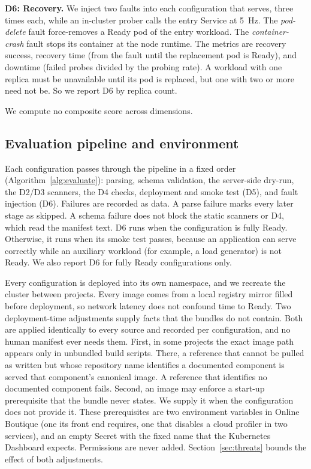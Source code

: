 \textbf{D6: Recovery.} We inject two faults into each configuration that serves, three times each, while an in-cluster prober calls the entry Service at 5~Hz. The \emph{pod-delete} fault force-removes a Ready pod of the entry workload. The \emph{container-crash} fault stops its container at the node runtime. The metrics are recovery success, recovery time (from the fault until the replacement pod is Ready), and downtime (failed probes divided by the probing rate). A workload with one replica must be unavailable until its pod is replaced, but one with two or more need not be. So we report D6 by replica count.

We compute no composite score across dimensions.

\subsection{Evaluation pipeline and environment}\label{sec:method-pipeline}

Each configuration passes through the pipeline in a fixed order (Algorithm~\ref{alg:evaluate}): parsing, schema validation, the server-side dry-run, the D2/D3 scanners, the D4 checks, deployment and smoke test (D5), and fault injection (D6). Failures are recorded as data. A parse failure marks every later stage as skipped. A schema failure does not block the static scanners or D4, which read the manifest text. D6 runs when the configuration is fully Ready. Otherwise, it runs when its smoke test passes, because an application can serve correctly while an auxiliary workload (for example, a load generator) is not Ready. We also report D6 for fully Ready configurations only.

Every configuration is deployed into its own namespace, and we recreate the cluster between projects. Every image comes from a local registry mirror filled before deployment, so network latency does not confound time to Ready. Two deployment-time adjustments supply facts that the bundles do not contain. Both are applied identically to every source and recorded per configuration, and no human manifest ever needs them. First, in some projects the exact image path appears only in unbundled build scripts. There, a reference that cannot be pulled as written but whose repository name identifies a documented component is served that component's canonical image. A reference that identifies no documented component fails. Second, an image may enforce a start-up prerequisite that the bundle never states. We supply it when the configuration does not provide it. These prerequisites are two environment variables in Online Boutique (one its front end requires, one that disables a cloud profiler in two services), and an empty Secret with the fixed name that the Kubernetes Dashboard expects. Permissions are never added. Section~\ref{sec:threats} bounds the effect of both adjustments.

